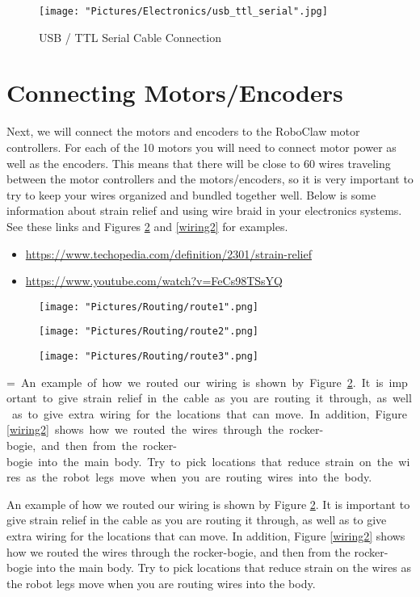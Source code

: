 \documentclass{article}
\makeatletter
\newcommand{\mybox}[1]{%
  \setbox0=\hbox{#1}%
  \setlength{\@tempdima}{\dimexpr\wd0+13pt}%
  \begin{tcolorbox}[colframe=mycolor,boxrule=0.5pt,arc=4pt,
      left=6pt,right=6pt,top=6pt,bottom=6pt,boxsep=0pt,width=0.95\textwidth]
    #1
  \end{tcolorbox}
}
\makeatother
\begin{document}
\begin{figure}[H]
	\centering
	\begin{minipage}[b]{0.45\textwidth}
		\texttt{[image: "Pictures/Electronics/usb\_ttl\_serial".jpg]}
	\end{minipage}
	\caption{USB / TTL Serial Cable Connection}
	\label{usb_ttl_serial}
\end{figure}

\section{Connecting Motors/Encoders}

Next, we will connect the motors and encoders to the RoboClaw motor controllers. For each of the 10 motors you will need to connect motor power as well as the encoders. This means that there will be close to 60 wires traveling between the motor controllers and the motors/encoders, so it is very important to try to keep your wires organized and bundled together well. Below is some information about strain relief and using wire braid in your electronics systems.  See these links and Figures \ref{wiring1} and \ref{wiring2} for examples.

\begin{itemize}
	\item \href{https://www.techopedia.com/definition/2301/strain-relief}{https://www.techopedia.com/definition/2301/strain-relief}
	\item \href{https://www.youtube.com/watch?v=FeCs98TSsYQ}{https://www.youtube.com/watch?v=FeCs98TSsYQ}
\end{itemize}


\begin{figure}[H]
  	\centering
  	\begin{minipage}[b]{0.34\textwidth}
    		\texttt{[image: "Pictures/Routing/route1".png]}
  	\end{minipage}
  	\hfill
  	\begin{minipage}[b]{0.29\textwidth}
    		\texttt{[image: "Pictures/Routing/route2".png]}
  	\end{minipage}
    	\hfill
  	\begin{minipage}[b]{0.30\textwidth}
    		\texttt{[image: "Pictures/Routing/route3".png]}
  	\end{minipage}
  	\caption{}
	\label{wiring1}
\end{figure}


\mybox{
An example of how we routed our wiring is shown by Figure \ref{wiring1}. It is important to give strain relief in the cable as you are routing it through, as well as to give extra wiring for the locations that can move. In addition, Figure \ref{wiring2} shows how we routed the wires through the rocker-bogie, and then from the rocker-bogie into the main body. Try to pick locations that reduce strain on the wires as the robot legs move when you are routing wires into the body.
}
\end{document}
